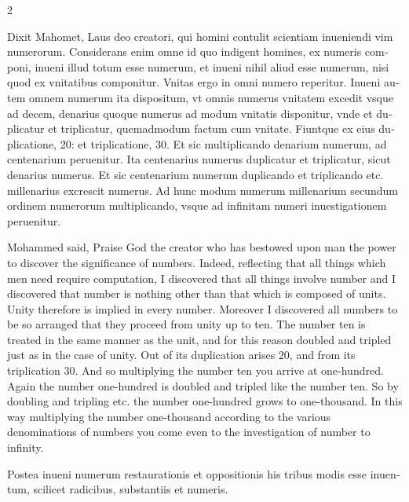\documentclass[11pt,a4paper,twoside]{book}
\newcommand{\latincolumn}[1]{\textlatin{\small #1}}
\newcommand{\englishcolumn}[1]{\small #1}
\begin{document}
\begin{paracol}{2}
\switchcolumn*

\latincolumn{Dixit Mahomet, Laus deo creatori, qui homini contulit scientiam inueniendi vim numerorum. Considerans enim omne id quo indigent homines, ex numeris componi, inueni illud totum esse numerum, et inueni nihil aliud esse numerum, nisi quod ex vnitatibus componitur. Vnitas ergo in omni numero reperitur. Inueni autem omnem numerum ita dispositum, vt omnis numerus vnitatem excedit vsque ad decem, denarius quoque numerus ad modum vnitatis disponitur, vnde et duplicatur et triplicatur, quemadmodum factum cum vnitate. Fiuntque ex eius duplicatione, 20: et triplicatione, 30. Et sic multiplicando denarium numerum, ad centenarium peruenitur. Ita centenarius numerus duplicatur et triplicatur, sicut denarius numerus. Et sic centenarium numerum duplicando et triplicando etc. millenarius excrescit numerus. Ad hunc modum numerum millenarium secundum ordinem numerorum multiplicando, vsque ad infinitam numeri inuestigationem peruenitur.}

\switchcolumn

\englishcolumn{Mohammed said, Praise God the creator who has bestowed upon man the power to discover the significance of numbers. Indeed, reflecting that all things which men need require computation, I discovered that all things involve number and I discovered that number is nothing other than that which is composed of units. Unity therefore is implied in every number. Moreover I discovered all numbers to be so arranged that they proceed from unity up to ten. The number ten is treated in the same manner as the unit, and for this reason doubled and tripled just as in the case of unity. Out of its duplication arises 20, and from its triplication 30. And so multiplying the number ten you arrive at one-hundred. Again the number one-hundred is doubled and tripled like the number ten. So by doubling and tripling etc. the number one-hundred grows to one-thousand. In this way multiplying the number one-thousand according to the various denominations of numbers you come even to the investigation of number to infinity.}

\switchcolumn*

\latincolumn{Postea inueni numerum restaurationis et oppositionis his tribus modis esse inuentum, scilicet radicibus, substantiis et numeris.}


\end{paracol}
\end{document}
